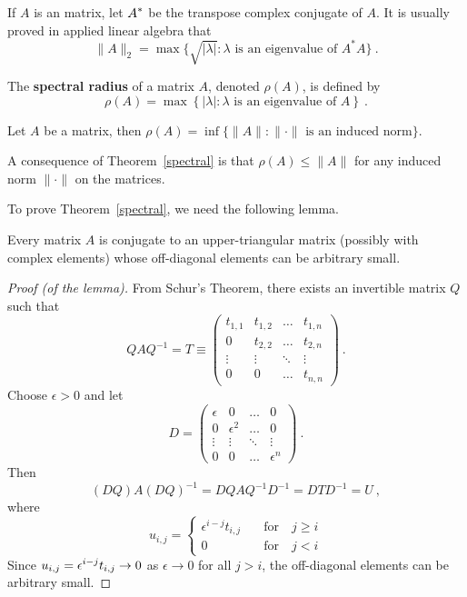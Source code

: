\begin{rmk}
If $A$ is an \nn matrix, let $\displaystyle A^\ast$ be the transpose complex
conjugate of $A$.  It is usually proved in applied linear algebra that
\[
\|A\|_2 = \max \{ \sqrt{|\lambda|} : \lambda \text{ is an eigenvalue of }
A^\ast A \} \ .
\]  \label{iter_LE_eig1}
\end{rmk}

\begin{defn}
The {\bfseries spectral radius}
of a \nn matrix $A$, denoted $\rho (A)$, is defined by
\[
\rho (A) = \max \left\{ |\lambda| : \lambda \text{ is an eigenvalue of } A
\right\} \ .
\]  \label{iter_LE_eig2}
\end{defn}

\begin{theorem}
Let $A$ be a \nn matrix, then
$\rho(A) = \inf \{ \|A\| : \|\cdot\| \text{ is an induced norm} \}$.
\label{spectral}
\end{theorem}

\begin{rmk}
A consequence of Theorem~\ref{spectral} is that
$\rho (A) \leq \| A \|$ for any induced norm $\|\cdot\|$ on the
\nn matrices.  \label{iter_LE_eig3}
\end{rmk}

To prove Theorem~\ref{spectral}, we need the following lemma.

\begin{lemma}
Every \nn matrix $A$ is conjugate to an upper-triangular
matrix (possibly with complex elements) whose off-diagonal
elements can be arbitrary small.
\end{lemma}

\begin{proof}[Proof (of the lemma)]
From Schur's Theorem, there exists an invertible matrix $Q$ such that
\[
QAQ^{-1} = T \equiv
\begin{pmatrix}
t_{1,1} & t_{1,2} & \ldots & t_{1,n} \\
0 & t_{2,2} & \ldots & t_{2,n} \\
\vdots & \vdots & \ddots & \vdots \\
0 & 0 & \ldots & t_{n,n}
\end{pmatrix} \ .
\]
Choose $\epsilon > 0$ and let
\[
D = \begin{pmatrix}
\epsilon & 0 & \ldots & 0 \\
0 & \epsilon^2 & \ldots & 0 \\
\vdots & \vdots & \ddots & \vdots \\
0 & 0 & \ldots & \epsilon^n
\end{pmatrix} \ .
\]
Then
\[
(DQ)A(DQ)^{-1} = DQAQ^{-1}D^{-1} = DTD^{-1} = U \ ,
\]
where 
\[
u_{i,j} = \begin{cases}
\epsilon^{i-j} t_{i,j} & \quad \text{for} \quad j\geq i \\
0 & \quad \text{for}\quad  j<i
\end{cases}
\]
Since $\displaystyle u_{i,j} = \epsilon^{i-j} t_{i,j} \rightarrow 0$
as $\epsilon \rightarrow 0$ for all $j>i$, the off-diagonal elements
can be arbitrary small.
\end{proof}

